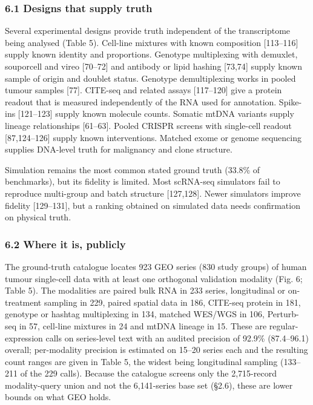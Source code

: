 \documentclass[11pt]{article}
\begin{document}
\subsubsection{6.1 Designs that supply
truth}\label{designs-that-supply-truth}

Several experimental designs provide truth independent of the
transcriptome being analysed (Table 5). Cell-line mixtures with known
composition {[}113--116{]} supply known identity and proportions.
Genotype multiplexing with demuxlet, souporcell and vireo {[}70--72{]}
and antibody or lipid hashing {[}73,74{]} supply known sample of origin
and doublet status. Genotype demultiplexing works in pooled tumour
samples {[}77{]}. CITE-seq and related assays {[}117--120{]} give a
protein readout that is measured independently of the RNA used for
annotation. Spike-ins {[}121--123{]} supply known molecule counts.
Somatic mtDNA variants supply lineage relationships {[}61--63{]}. Pooled
CRISPR screens with single-cell readout {[}87,124--126{]} supply known
interventions. Matched exome or genome sequencing supplies DNA-level
truth for malignancy and clone structure.

Simulation remains the most common stated ground truth (33.8\% of
benchmarks), but its fidelity is limited. Most scRNA-seq simulators fail
to reproduce multi-group and batch structure {[}127,128{]}. Newer
simulators improve fidelity {[}129--131{]}, but a ranking obtained on
simulated data needs confirmation on physical truth.

\subsubsection{6.2 Where it is, publicly}\label{where-it-is-publicly}

The ground-truth catalogue locates 923 GEO series (830 study groups) of
human tumour single-cell data with at least one orthogonal validation
modality (Fig. 6; Table 5). The modalities are paired bulk RNA in 233
series, longitudinal or on-treatment sampling in 229, paired spatial
data in 186, CITE-seq protein in 181, genotype or hashtag multiplexing
in 134, matched WES/WGS in 106, Perturb-seq in 57, cell-line mixtures in
24 and mtDNA lineage in 15. These are regular-expression calls on
series-level text with an audited precision of 92.9\% (87.4--96.1)
overall; per-modality precision is estimated on 15--20 series each and
the resulting count ranges are given in Table 5, the widest being
longitudinal sampling (133--211 of the 229 calls). Because the catalogue
screens only the 2,715-record modality-query union and not the
6,141-series base set (§2.6), these are lower bounds on what GEO holds.
\end{document}
